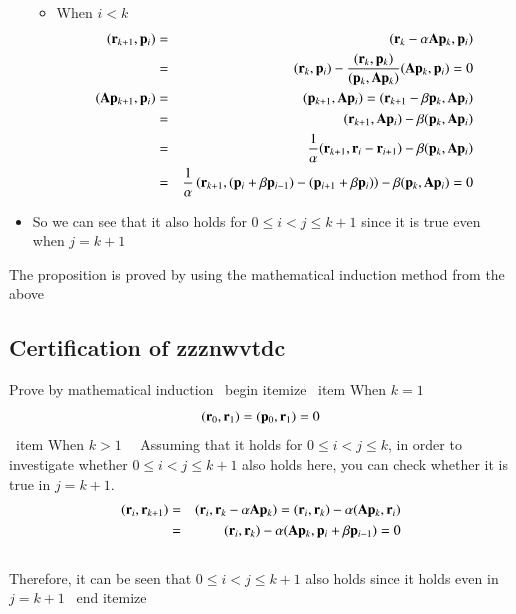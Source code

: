 \begin{itemize}
\begin {itemize}
\item When $i<k$ \ \
\begin{eqnarray}
(\mathbf{r}_{k+1},\mathbf{p}_i)
&=&  (\mathbf{r}_k-\alpha\mathbf{A}\mathbf{p}_k,\mathbf{p}_i)\\
&=& (\mathbf{r}_k,\mathbf{p}_i)-\frac{(\mathbf{r}_k,\mathbf{p}_k)}{(\mathbf{p}_k,\mathbf{A}\mathbf{p}_k)}(\mathbf{A}\mathbf{p}_k,\mathbf{p}_i)=0\\
(\mathbf{A}\mathbf{p}_{k+1},\mathbf{p}_i)
&=&  (\mathbf{p}_{k+1},\mathbf{A}\mathbf{p}_i)  =  (\mathbf{r}_{k+1}-\beta\mathbf{p}_k,\mathbf{A}\mathbf{p}_i)  \\
&=&  (\mathbf{r}_{k+1},\mathbf{A}\mathbf{p}_i)-\beta(\mathbf{p}_k,\mathbf{A}\mathbf{p}_i)\\
&=&   \frac{1}{\alpha}(\mathbf{r}_{k+1},\mathbf{r}_i-\mathbf{r}_{i+1})-\beta(\mathbf{p}_k,\mathbf{A}\mathbf{p}_i)\\
&=&  \frac{1}{\alpha}\left(\mathbf{r}_{k+1},(\mathbf{p}_i+\beta\mathbf{p}_{i-1})-(\mathbf{p}_{i+1}+\beta\mathbf{p}_i)\right)-\beta(\mathbf{p}_k,\mathbf{A}\mathbf{p}_i)=0
\end{eqnarray}
\end {itemize}

\item So we can see that it also holds for $0\le{i}<{j}\le{k+1}$ since it is true even when $j=k+1$
\end {itemize}

The proposition is proved by using the mathematical induction method from the above



\subsection{Certification of zzznwvtdc}


Prove by mathematical induction
\ begin {itemize}
\ item When $k=1$ \\
\begin{equation}
(\mathbf{r}_0,\mathbf{r}_1)=(\mathbf{p}_0,\mathbf{r}_1)=0
\end{equation}
\ item When $k>1$ \ \
Assuming that it holds for $0\le{i}<{j}\le{k}$, in order to investigate whether $0\le{i}<{j}\le{k+1}$ also holds here, you can check whether it is true in $j=k+1$. \\
\begin{eqnarray}
(\mathbf{r}_i,\mathbf{r}_{k+1})
&=&  (\mathbf{r}_i,\mathbf{r}_k-\alpha\mathbf{A}\mathbf{p}_k)  =  (\mathbf{r}_i,\mathbf{r}_k)-\alpha(\mathbf{A}\mathbf{p}_k,\mathbf{r}_i)\\
&=&  (\mathbf{r}_i,\mathbf{r}_k)-\alpha(\mathbf{A}\mathbf{p}_k,\mathbf{p}_i+\beta\mathbf{p}_{i-1})  =  0
\end{eqnarray}\\
Therefore, it can be seen that $0\le{i}<{j}\le{k+1}$ also holds since it holds even in $j=k+1$
\ end {itemize}

